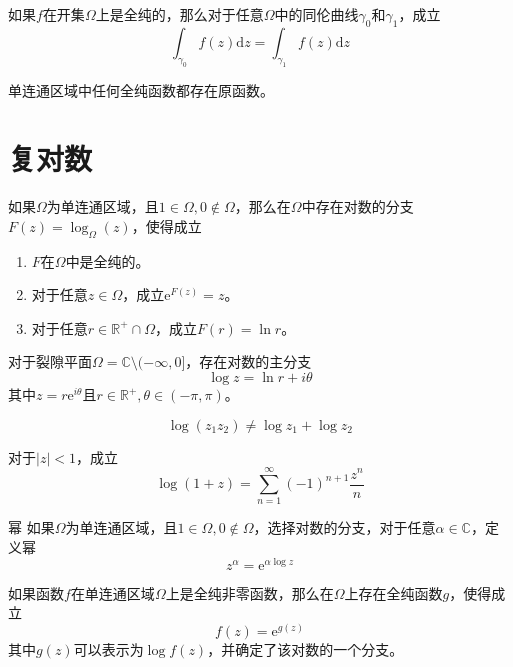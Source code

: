 \documentclass[lang = cn, scheme = chinese, thmcnt = section]{elegantbook}
\newcommand{\R}{\mathbb{R}}            %
\newcommand{\C}{\mathbb{C}}  		   %
\begin{document}
\begin{theorem}
	如果$f$在开集$\Omega$上是全纯的，那么对于任意$\Omega$中的同伦曲线$\gamma_0$和$\gamma_1$，成立
	$$
	\int_{\gamma_0}{f(z)\mathrm{d}z}=\int_{\gamma_1}{f(z)\mathrm{d}z}
	$$
\end{theorem}

\begin{theorem}
	单连通区域中任何全纯函数都存在原函数。
\end{theorem}

\section{复对数}

\begin{theorem}
	如果$\Omega$为单连通区域，且$1\in\Omega,0\notin\Omega$，那么在$\Omega$中存在对数的分支$F(z)=\log_{\Omega}(z)$，使得成立
	\begin{enumerate}
		\item $F$在$\Omega$中是全纯的。
		\item 对于任意$z\in\Omega$，成立$\mathrm{e}^{F(z)}=z$。
		\item 对于任意$r\in\R^+\cap\Omega$，成立$F(r)=\ln{r}$。
	\end{enumerate}
\end{theorem}

\begin{theorem}
	对于裂隙平面$\Omega=\C\setminus(-\infty,0] $，存在对数的主分支
	$$
	\log{z}=\ln{r}+i\theta
	$$
	其中$z=r\mathrm{e}^{i\theta}$且$r\in\R^+,\theta\in(-\pi,\pi)$。
\end{theorem}

\begin{remark}
	$$
	\log(z_1z_2)\ne\log{z_1}+\log{z_2}
	$$
\end{remark}

\begin{theorem}
	对于$|z|<1$，成立
	$$
	\log{(1+z)}=\sum_{n=1}^{\infty}{(-1)^{n+1}\frac{z^n}{n}}
	$$
\end{theorem}

\begin{definition}{幂}
	如果$\Omega$为单连通区域，且$1\in\Omega,0\notin\Omega$，选择对数的分支，对于任意$\alpha\in\C$，定义幂
	$$
	z^\alpha=\mathrm{e}^{\alpha\log{z}}
	$$
\end{definition}

\begin{theorem}
	如果函数$f$在单连通区域$\Omega$上是全纯非零函数，那么在$\Omega$上存在全纯函数$g$，使得成立
	$$
	f(z)=\mathrm{e}^{g(z)}
	$$
	其中$g(z)$可以表示为$\log{f(z)}$，并确定了该对数的一个分支。
\end{theorem}
\end{document}
